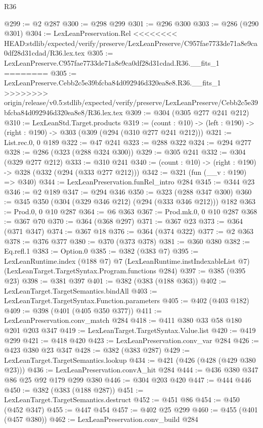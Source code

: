 \begin{lexlean}{R36}
\begin{coremodule}
{{{{{{{{@299 := @2 @287
@300 := @298 @299
@301 := @296 @300
@303 := @286 (@290 @301)
@304 := LexLeanPreservation.Rel
<<<<<<<< HEAD:stdlib/expected/verify/preserve/LexLeanPreserve/C957fae7733de71a8e9ca0df28d31cdad/R36.lex.tex
@305 := LexLeanPreserve.C957fae7733de71a8e9ca0df28d31cdad.R36.__fits_1
========
@305 := LexLeanPreserve.Cebb2c5e39bfcba84d092946d320ea8e8.R36.__fits_1
>>>>>>>> origin/release/v0.5:stdlib/expected/verify/preserve/LexLeanPreserve/Cebb2c5e39bfcba84d092946d320ea8e8/R36.lex.tex
@309 := @304 (@305 @277 @241 @212)
@310 := LexLeanStd.Target.products
@319 := (count : @10) -> (left : @190) -> (right : @190) -> @303 (@309 (@294 (@310 @277 @241 @212)))
@321 := List.rec.{0, 0} @189
@322 := @47 @241
@323 := @288 @322
@324 := @294 @277
@328 := @286 (@323 (@288 @324 @300))
@329 := @305 @241
@332 := @304 (@329 @277 @212)
@333 := @310 @241
@340 := (count : @10) -> (right : @190) -> @328 (@332 (@294 (@333 @277 @212)))
@342 := @321 (fun (__v : @190) => @340)
@344 := LexLeanPreservation.funRel_intro @284
@345 := @344 @23
@346 := @2 @189
@347 := @294 @346
@350 := @323 (@288 @347 @300)
@360 := @345 @350 (@304 (@329 @346 @212) (@294 (@333 @346 @212))) @182
@363 := Prod.{0, 0} @10 @287
@364 := @6 @363
@367 := Prod.mk.{0, 0} @10 @287
@368 := @367 @70
@370 := @364 (@368 @297)
@371 := @367 @23
@373 := @364 (@371 @347)
@374 := @367 @18
@376 := @364 (@374 @322)
@377 := @2 @363
@378 := @376 @377
@380 := @370 (@373 @378)
@381 := @360 @380
@382 := Eq.refl.{1}
@383 := Option.{0}
@385 := @382 (@383 @7)
@395 := LexLeanRuntime.index
    (@188 @7)
    @7
    (LexLeanRuntime.instIndexableList @7)
    (LexLeanTarget.TargetSyntax.Program.functions @284)
@397 := @385 (@395 @23)
@398 := @381 @397
@401 := @382 (@383 (@188 @363))
@402 := LexLeanTarget.TargetSemantics.bindAll
@403 := LexLeanTarget.TargetSyntax.Function.parameters
@405 := @402 (@403 @182)
@409 := @398 (@401 (@405 @350 @377))
@411 := LexLeanPreservation.conv_match @284
@418 := @411 @380 @33 @58 @180 @201 @203 @347
@419 := LexLeanTarget.TargetSyntax.Value.list
@420 := @419 @299
@421 := @418 @420
@423 := LexLeanPreservation.conv_var @284
@426 := @423 @380 @23 @347
@428 := @382 (@383 @287)
@429 := LexLeanTarget.TargetSemantics.lookup
@434 := @421 (@426 (@428 (@429 @380 @23)))
@436 := LexLeanPreservation.convA_hit @284
@444 := @436 @380 @347 @86 @25 @92 @179 @299 @380
@446 := @304 @203 @420
@447 := @444 @446
@450 := @382 (@383 (@188 @287))
@451 := LexLeanTarget.TargetSemantics.destruct
@452 := @451 @86
@454 := @450 (@452 @347)
@455 := @447 @454
@457 := @402 @25 @299
@460 := @455 (@401 (@457 @380))
@462 := LexLeanPreservation.conv_build @284
}}}}}}}}
\end{coremodule}
\end{lexlean}
